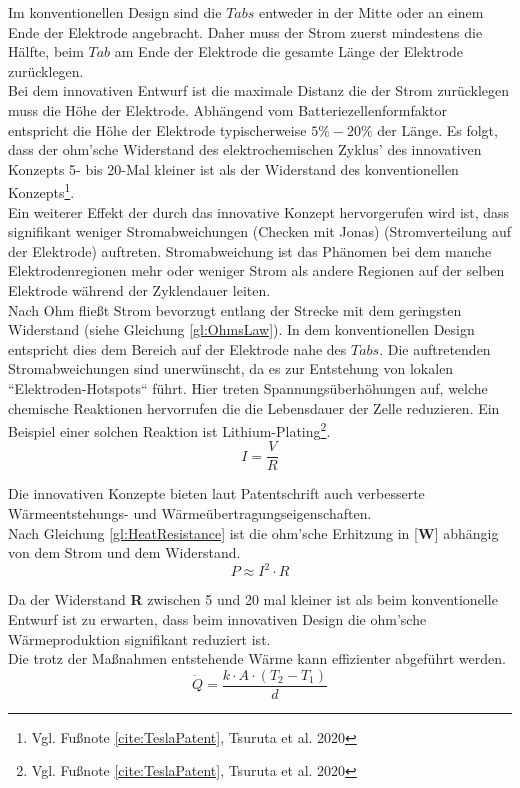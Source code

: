 Im konventionellen Design sind die $Tabs$ entweder in der Mitte oder an einem Ende der Elektrode angebracht. Daher muss der Strom zuerst mindestens die Hälfte, beim $Tab$ am Ende der Elektrode die gesamte Länge der Elektrode zurücklegen. \\
Bei dem innovativen Entwurf ist die maximale Distanz die der Strom zurücklegen muss die Höhe der Elektrode. Abhängend vom Batteriezellenformfaktor entspricht die Höhe der Elektrode typischerweise $5\percent-20\percent$ der Länge. Es folgt, dass der ohm'sche Widerstand des elektrochemischen Zyklus' des innovativen Konzepts 5- bis 20-Mal kleiner ist als der Widerstand des konventionellen Konzepts\footnote{Vgl. Fußnote \ref{cite:TeslaPatent}, Tsuruta et al. 2020}.\\
Ein weiterer Effekt der durch das innovative Konzept hervorgerufen wird ist, dass signifikant weniger Stromabweichungen (Checken mit Jonas) (Stromverteilung auf der Elektrode) auftreten. Stromabweichung ist das Phänomen bei dem manche Elektrodenregionen mehr oder weniger Strom als andere Regionen auf der selben Elektrode während der Zyklendauer leiten.\\
Nach Ohm fließt Strom bevorzugt entlang der Strecke mit dem geringsten Widerstand (siehe Gleichung \ref{gl:OhmsLaw}). In dem konventionellen Design entspricht dies dem Bereich auf der Elektrode nahe des $Tabs$. Die auftretenden Stromabweichungen sind unerwünscht, da es zur Entstehung von lokalen ``Elektroden-Hotspots`` führt. Hier treten Spannungsüberhöhungen auf, welche chemische Reaktionen hervorrufen die die Lebensdauer der Zelle reduzieren. Ein Beispiel einer solchen Reaktion ist Lithium-Plating\footnote{Vgl. Fußnote \ref{cite:TeslaPatent}, Tsuruta et al. 2020}.
\begin{equation}
	I = \frac{V}{R}
	\label{gl:OhmsLaw}
\end{equation}

Die innovativen Konzepte bieten laut Patentschrift auch verbesserte Wärmeentstehungs- und Wärmeübertragungseigenschaften.\\
Nach Gleichung \ref{gl:HeatResistance} ist die ohm'sche Erhitzung in [\textbf{W}] abhängig von dem Strom und dem Widerstand. 
\begin{equation}
	 P \approx I^{2} \cdot R
	 \label{gl:HeatResistance}
\end{equation}

Da der Widerstand \textbf{R} zwischen 5 und 20 mal kleiner ist als beim konventionelle Entwurf ist zu erwarten, dass beim innovativen Design die ohm'sche Wärmeproduktion signifikant reduziert ist.\\
Die trotz der Maßnahmen entstehende Wärme kann effizienter abgeführt werden.
\begin{equation}
	\dot{Q} = \frac{k\cdot A\cdot (T_{2} - T_{1})}{d}
	\label{gl:HeatTransferEquation}
\end{equation}


